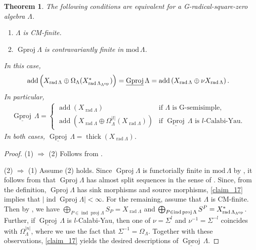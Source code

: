 \documentclass[12pt]{amsart}
\numberwithin{equation}{subsection}
\theoremstyle{plain}
\newtheorem{theorem}{Theorem}[section]
\theoremstyle{definition}
\newcommand{\rad}{\operatorname{rad}}
\newcommand{\add}{\operatorname{add}}
\renewcommand{\mod}{\mathrm{mod}\,}
\newcommand{\proj}{\operatorname{proj}}
\newcommand{\Gproj}{\operatorname{Gproj}}
\newcommand{\sGproj}{\underline{\operatorname{Gproj}}\,}
\newcommand{\ind}{\operatorname{ind}}
\newcommand{\thick}{\operatorname{thick}}
\renewcommand{\L}{\Lambda}
\newcommand{\op}{{\rm op}}
\begin{document}
\begin{theorem}\label{claim_19}
The following conditions are equivalent for a G-radical-square-zero algebra $\L$.
\begin{enumerate}
    \item $\L$ is CM-finite.
    \item $\Gproj\L$ is contravariantly finite in $\mod\L$.
\end{enumerate}
In this case, 
\begin{align}
    \textstyle 
    \add\left(X_{\rad\L}\oplus \Omega_{\L}(X_{\rad\L_{\L^\op}}^*)\right) 
    = \sGproj\L 
    = \add\left(X_{\rad\L} \oplus \nu X_{\rad\L}\right).
\end{align}
In particular,
\begin{align}
    \textstyle 
    \sGproj\L  =     
    \begin{cases}
    \add(X_{\rad\L}) & \text{if $\L$ is G-semisimple,}\\[5pt]
    \add\left(X_{\rad\L}\oplus \Omega_\L^{|l|}(X_{\rad\L})\right) & \text{if $\sGproj\L $ is $l$-Calabi-Yau.}
    \end{cases}
\end{align}
In both cases, $\sGproj\L = \thick(X_{\rad\L})$.
\end{theorem} 
\begin{proof}
(1) $\Rightarrow$ (2) 
Follows from \cite[Proposition 4.2]{Auslander-Smalo_1980}.  





(2) $\Rightarrow$ (1)
Assume (2) holds.
Since $\Gproj\L$ is functorially finite in $\mod\L$ by \cite[Corollary 2.6]{Krause-Solberg_2003}, it follows from \cite[Theorem 2.4]{Auslander-Smalo_1981} that $\Gproj\L$ has almost split sequences in the sense of \cite[p.429]{Auslander-Smalo_1981}.
Since, from the definition, $\Gproj\L$ has sink morphisms and source morphisms,  \cref{claim_17} implies that $|\ind\Gproj\L| <\infty$.
For the remaining, assume that $\L$ is CM-finite.
Then by \cite[Lemma 3.2]{Hafezi-Bahlekeh_2024}, we have $\bigoplus_{P\in\ind\proj\L} S_P = X_{\rad\L}$ and $\bigoplus_{P\in\ind\proj\L} S^P = X_{\rad\L_{\L^\op}}^*$.
Further, if $\sGproj\L$ is $l$-Calabi-Yau, then one of $\nu=\Sigma^{l}$ and $\nu^{-1}=\Sigma^{-l}$ coincides with $\Omega_\L^{|n|}$, where we use the fact that $\Sigma^{-1}=\Omega_\L$.
Together with these observations,  \cref{claim_17} yields the desired descriptions of $\sGproj\L$.
\end{proof}
\end{document}
